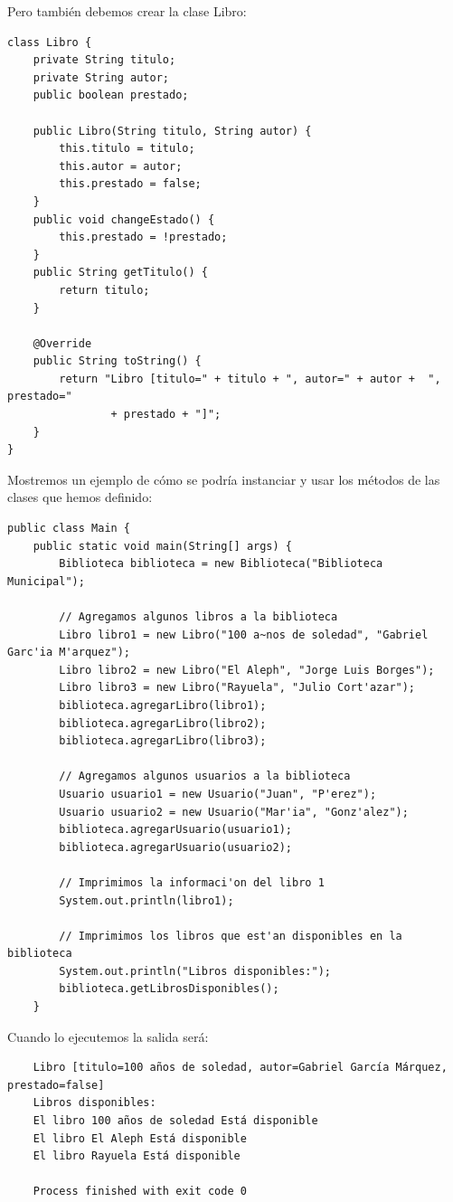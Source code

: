 \documentclass[executivepaper]{article}
\begin{document}
Pero también debemos crear la clase Libro:
\begin{lstlisting}
class Libro {
    private String titulo;
    private String autor;
    public boolean prestado;

    public Libro(String titulo, String autor) {
        this.titulo = titulo;
        this.autor = autor;
        this.prestado = false;
    }
    public void changeEstado() {
        this.prestado = !prestado;
    }
    public String getTitulo() {
        return titulo;
    }

    @Override
    public String toString() {
        return "Libro [titulo=" + titulo + ", autor=" + autor +  ", prestado="
                + prestado + "]";
    }
}
\end{lstlisting}

Mostremos un ejemplo de cómo se podría instanciar y usar los métodos de las clases que hemos definido:
\begin{lstlisting}
public class Main {
    public static void main(String[] args) {
        Biblioteca biblioteca = new Biblioteca("Biblioteca Municipal");

        // Agregamos algunos libros a la biblioteca
        Libro libro1 = new Libro("100 a~nos de soledad", "Gabriel Garc'ia M'arquez");
        Libro libro2 = new Libro("El Aleph", "Jorge Luis Borges");
        Libro libro3 = new Libro("Rayuela", "Julio Cort'azar");
        biblioteca.agregarLibro(libro1);
        biblioteca.agregarLibro(libro2);
        biblioteca.agregarLibro(libro3);

        // Agregamos algunos usuarios a la biblioteca
        Usuario usuario1 = new Usuario("Juan", "P'erez");
        Usuario usuario2 = new Usuario("Mar'ia", "Gonz'alez");
        biblioteca.agregarUsuario(usuario1);
        biblioteca.agregarUsuario(usuario2);

        // Imprimimos la informaci'on del libro 1
        System.out.println(libro1);

        // Imprimimos los libros que est'an disponibles en la biblioteca
        System.out.println("Libros disponibles:");
        biblioteca.getLibrosDisponibles();
    }
\end{lstlisting}
Cuando lo ejecutemos la salida será:
\begin{verbatim}
    Libro [titulo=100 años de soledad, autor=Gabriel García Márquez, prestado=false]
    Libros disponibles:
    El libro 100 años de soledad Está disponible
    El libro El Aleph Está disponible
    El libro Rayuela Está disponible

    Process finished with exit code 0
\end{verbatim}
\newpage
\end{document}
